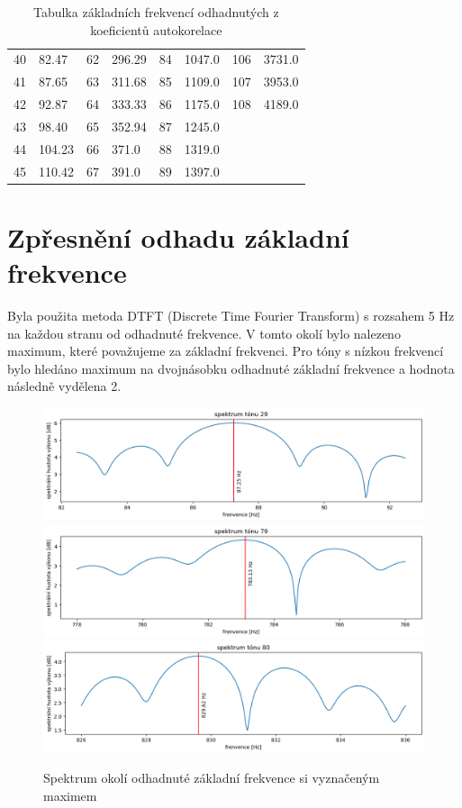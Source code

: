 \documentclass[a4paper, 12pt]{article}
\begin{document}
\begin{table}[H]
\begin{tabularx}{\textwidth}{r|Xr|Xr|Xr|X}
		40 & 82.47        &        62 & 296.29        &        84 & 1047.0&        106 & 3731.0 \\
		41 & 87.65        &        63 & 311.68        &        85 & 1109.0&        107 & 3953.0 \\
		42 & 92.87        &        64 & 333.33        &        86 & 1175.0&        108 & 4189.0 \\
		43 & 98.40        &        65 & 352.94        &        87 & 1245.0& & \\
		44 & 104.23       &        66 & 371.0         &        88 & 1319.0& & \\
		45 & 110.42       &        67 & 391.0         &        89 & 1397.0& & \\
		\end{tabularx}
	\caption{Tabulka základních frekvencí odhadnutých z koeficientů autokorelace}
	\end{table}
	
	\pagebreak
	\section{Zpřesnění odhadu základní frekvence} \label{dtft}
	Byla použita metoda DTFT (Discrete Time Fourier Transform) s rozsahem 5 Hz na každou stranu od odhadnuté frekvence. V tomto okolí bylo nalezeno maximum, které považujeme za základní frekvenci. Pro tóny s nízkou frekvencí bylo hledáno maximum na dvojnásobku odhadnuté základní frekvence a hodnota následně vydělena 2.
	
	\begin{figure}[H]
		\includegraphics[width=\textwidth]{src/prec_a.png}
		\includegraphics[width=\textwidth]{src/prec_b.png}
		\includegraphics[width=\textwidth]{src/prec_c.png}
		\caption{Spektrum okolí odhadnuté základní frekvence si vyznačeným maximem}
	\end{figure}
\end{document}
